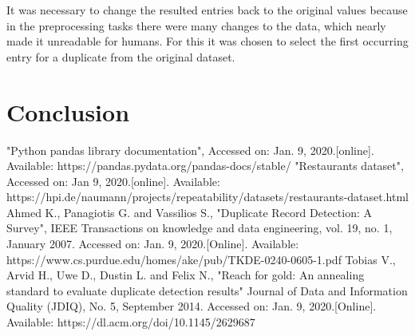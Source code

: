 \documentclass[conference]{IEEEtran}
\begin{document}
It was necessary to change the resulted entries back to the original values because in the preprocessing tasks there were many changes to the data, which nearly made it unreadable for humans. For this it was chosen to select the first occurring entry for a duplicate from the original dataset.

\section{Conclusion}
\begin{thebibliography}{00}
	 "Python pandas library documentation", Accessed on: Jan. 9, 2020.[online]. Available: https://pandas.pydata.org/pandas-docs/stable/
	 "Restaurants dataset", Accessed on: Jan 9, 2020.[online]. Available: https://hpi.de/naumann/projects/repeatability/datasets/restaurants-dataset.html
	 Ahmed K., Panagiotis G. and Vassilios S., "Duplicate Record Detection: A Survey", IEEE Transactions on knowledge and data engineering, vol. 19, no. 1, January 2007. Accessed on: Jan. 9, 2020.[Online]. Available: https://www.cs.purdue.edu/homes/ake/pub/TKDE-0240-0605-1.pdf
	 Tobias V., Arvid H., Uwe D., Dustin L. and Felix N., "Reach for gold: An annealing standard to evaluate duplicate detection results" Journal of Data and Information Quality (JDIQ), No. 5, September 2014. Accessed on: Jan. 9, 2020.[Online]. Available: https://dl.acm.org/doi/10.1145/2629687
\end{thebibliography}
\end{document}
